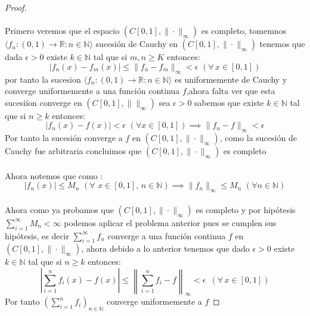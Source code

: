 \documentclass[11pt,letterpaper]{article}
\newcommand{\R}{\mathbb{R}}
\newcommand{\N}{\mathbb{N}}
\begin{document}
\begin{proof}\,\\
    \,\\
    Primero veremos que el espacio $(C[0,1],\|\cdot\|_{\infty})$ es completo, tomemnos $\langle f_n:(0,1)\to \R:n\in \N\rangle$ sucesi\'on de Cauchy en $(C[0,1],\|\cdot\|_{\infty})$ tenemos que dada $\epsilon>0$ existe $k\in \N$ tal que si $m,n\geq K$ entonces:\,\\
    \begin{equation*}
        |f_n(x)-f_m(x)|\leq \|f_n-f_m\|_{\infty}<\epsilon\,\,(\forall\,x\in[0,1])
    \end{equation*}
    por tanto la sucesion $\langle f_n:(0,1)\rightarrow \R:n\in \N \rangle$ es uniformemente de Cauchy y converge uniformemente a una funci\'on continua $f$,ahora falta ver que esta sucesi\'ion converge en $(C[0,1],\|\|_{\infty})$ sea $\epsilon>0$ sabemos que existe $k\in \N$ tal que si $n\geq k$ entonces:\,\\
    \begin{equation*}
        |f_n(x)-f(x)|< \epsilon\,\,(\forall x\in [0,1])\implies \|f_n-f\|_{\infty}<\epsilon
    \end{equation*}
    Por tanto la sucesi\'on converge a $f$ en $(C[0,1],\|\cdot\|_{\infty})$, como la sucesi\'on de Cauchy fue arbitraria concluimos que $(C[0,1],\|\cdot\|_{\infty})$ es completo
    \,\\
    \,\\
    Ahora notemos que como :
    \begin{equation*}
        |f_n(x)|\leq M_n\,\,(\forall\,\,x\in [0,1],\,n\in \N)\implies \|f_n\|_{\infty}\leq M_n\,\,(\forall n\in \N)
    \end{equation*}\,\\
    Ahora como ya probamos que $(C[0,1],\|\cdot\|_{\infty})$ es completo y por hip\'otesis $\sum_{i=1}^{\infty}M_n<\infty$ podemos aplicar el problema anterior pues se cumplen sus hip\'otesis, es decir
    $\sum_{i=1}^{\infty}f_n$ converge a una funci\'on continua $f$ en $(C[0,1],\|\cdot\|_{\infty})$, ahora debido a lo anterior tenemos que dado $\epsilon>0$ existe $k\in \N$ tal que si $n\geq k$ entonces:\,\\
    \begin{equation*}
        \left|\sum_{i=1}^{n}f_i(x)-f(x)\right|\leq \left\|\sum_{i=1}^nf_i-f\right\|_{\infty}<\epsilon\,\,\,(\forall\,x\in [0,1])
    \end{equation*}
    Por tanto $(\sum_{i=1}^nf_i)_{n\in \N}$ converge uniformemente a $f$
\end{proof}
\end{document}
